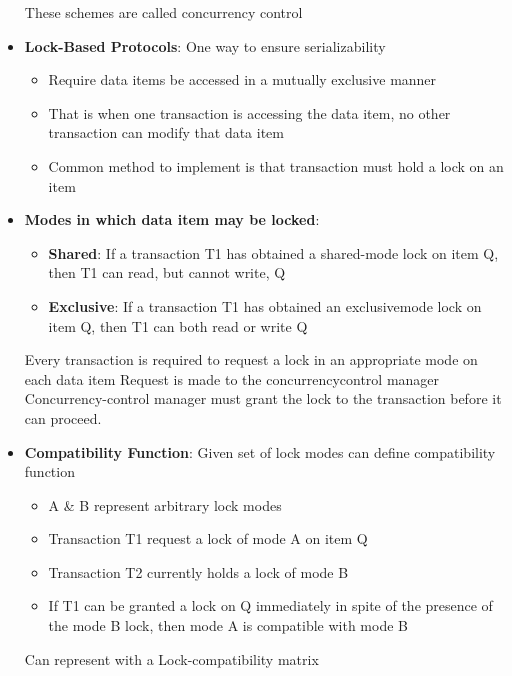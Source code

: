\documentclass{report}
\begin{document}
\begin{itemize}
            \bigbreak \noindent 
            These schemes are called concurrency control
        \item \textbf{Lock-Based Protocols}: One way to ensure serializability
            \begin{itemize}
                \item Require data items be accessed in a mutually exclusive manner
                \item That is when one transaction is accessing the data item, no other transaction can modify that data item
                \item Common method to implement is that transaction must hold a lock on an item
            \end{itemize}
        \item \textbf{Modes in which data item may be locked}:
            \begin{itemize}
                \item \textbf{Shared}: If a transaction T1 has obtained a shared-mode lock on item Q, then T1 can read, but cannot write, Q
                \item \textbf{Exclusive}: If a transaction T1 has obtained an exclusivemode lock on item Q, then T1 can both read or write Q
            \end{itemize}
            \bigbreak \noindent 
            Every transaction is required to request a lock in an appropriate mode on each data item
            \bigbreak \noindent 
            Request is made to the concurrencycontrol manager
            \bigbreak \noindent 
            Concurrency-control manager must grant the lock to the transaction before it can proceed.
        \item \textbf{Compatibility Function}: Given set of lock modes can define compatibility function
            \begin{itemize}
                \item A \& B represent arbitrary lock modes
                \item Transaction T1 request a lock of mode A on item Q
                \item Transaction T2 currently holds a lock of mode B
                \item If T1 can be granted a lock on Q immediately in spite of the presence of the mode B lock, then mode A is compatible with mode B
            \end{itemize}
            \bigbreak \noindent 
            Can represent with a Lock-compatibility matrix

\end{itemize}
\end{document}
